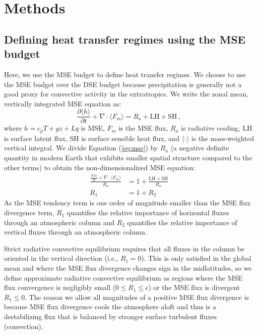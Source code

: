 \documentclass{ametsocV5}
\begin{document}
\section{Methods}

\subsection{Defining heat transfer regimes using the MSE budget}

    Here, we use the MSE budget to define heat transfer regimes. We choose to use the MSE budget over the DSE budget because precipitation is generally not a good proxy for convective activity in the extratropics. We write the zonal mean, vertically integrated MSE equation as: 
    \begin{equation} \label{eq:mse}
        \frac{\partial \langle h \rangle}{\partial t} + \nabla\cdot \langle F_{m} \rangle = R_{a} + \mathrm{LH+SH} \, ,
    \end{equation}
    where $h=c_p T + gz + Lq$ is MSE, $F_m$ is the MSE flux, $R_a$ is radiative cooling, $\mathrm{LH}$ is surface latent flux, $\mathrm{SH}$ is surface sensible heat flux, and $\langle \cdot \rangle$ is the mass-weighted vertical integral. We divide Equation (\ref{eq:mse}) by \(R_{a}\) (a negative definite quantity in modern Earth that exhibits smaller spatial structure compared to the other terms) to obtain the non-dimensionalized MSE equation:
    \begin{align}
        \frac{\frac{\partial \langle h \rangle}{\partial t} + \nabla\cdot \langle F_{m} \rangle }{R_{a}} &= 1 + \frac{\mathrm{LH+SH}}{R_{a}} \\
        R_{1} &= 1 + R_{2}
    \end{align}
    As the MSE tendency term is one order of magnitude smaller than the MSE flux divergence term, \(R_{1}\) quantifies the relative importance of horizontal fluxes through an atmospheric column and \(R_{2}\) quantifies the relative importance of vertical fluxes through an atmospheric column.
    
    Strict radiative convective equilibrium requires that all fluxes in the column be oriented in the vertical direction (i.e., \(R_{1}=0\)). This is only satisfied in the global mean and where the MSE flux divergence changes sign in the midlatitudes, so we define approximate radiative convective equilibrium as regions where the MSE flux convergence is negligibly small (\(0 \le R_{1} \le \epsilon\)) or the MSE flux is divergent \(R_{1}\le 0\). The reason we allow all magnitudes of a positive MSE flux divergence is because MSE flux divergence cools the atmosphere aloft and thus is a destabilizing flux that is balanced by stronger surface turbulent fluxes (convection).
    
\end{document}

